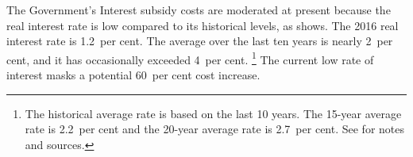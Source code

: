 \documentclass{article}
\begin{document}
The Government's \gls{Interest subsidy} costs are moderated at present because the real interest rate is low compared to its historical levels, as  shows.
The 2016 real interest rate is 1.2~per cent.
The average over the last ten years is nearly 2~per cent, and it has occasionally exceeded 4~per cent.%
\footnote{The historical average rate is based on the last 10 years.
The 15-year average rate is 2.2~per cent and the 20-year average rate is 2.7~per cent.
See  for notes and sources.} 
The current low rate of interest masks a potential 60~per cent cost increase.
\end{document}
